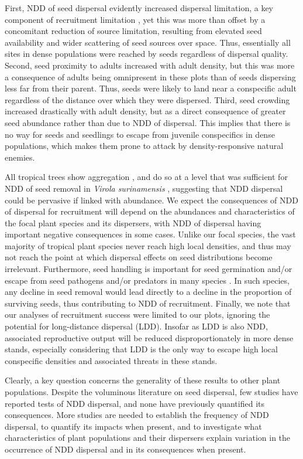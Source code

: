 \documentclass[b5paper,justified]{tufte-book} %
\begin{document}
\begin{fullwidth}
First, NDD of seed dispersal evidently increased dispersal limitation, a key component of recruitment limitation \citep{Nathan2000}, yet this was more than offset by a concomitant reduction of source limitation, resulting from elevated seed availability and wider scattering of seed sources over space. Thus, essentially all sites in dense populations were reached by seeds regardless of dispersal quality. Second, seed proximity to adults increased with adult density, but this was more a consequence of adults being omnipresent in these plots than of seeds dispersing less far from their parent. Thus, seeds were likely to land near a conspecific adult regardless of the distance over which they were dispersed. Third, seed crowding increased drastically with adult density, but as a direct consequence of greater seed abundance rather than due to NDD of dispersal. This implies that there is no way for seeds and seedlings to escape from juvenile conspecifics in dense populations, which makes them prone to attack by density-responsive natural enemies.

All tropical trees show aggregation \citep[e.g.][]{Condit2000}, and do so at a level that was sufficient for NDD of seed removal in \textit{Virola surinamensis} \citep{Manasse1983}, suggesting that NDD dispersal could be pervasive if linked with abundance. We expect the consequences of NDD of dispersal for recruitment will depend on the abundances and characteristics of the focal plant species and its dispersers, with NDD of dispersal having important negative consequences in some cases. Unlike our focal species, the vast majority of tropical plant species never reach high local densities, and thus may not reach the point at which dispersal effects on seed distributions become irrelevant. Furthermore, seed handling is important for seed germination and/or escape from seed pathogens and/or predators in many species \citep[e.g.][]{Traveset1998, Jansen2010}. In such species, any decline in seed removal would lead
directly to a decline in the proportion of surviving seeds, thus contributing to NDD of recruitment. Finally, we note that our analyses of recruitment success were limited to our plots, ignoring the potential for long-distance dispersal (LDD). Insofar as LDD is also NDD, associated reproductive output will be reduced disproportionately in more dense stands, especially considering that LDD is the only way to escape high local conspecific densities and associated threats in these stands.

Clearly, a key question concerns the generality of these results to other plant populations. Despite the voluminous literature on seed dispersal, few studies have reported tests of NDD dispersal, and none have previously quantified its consequences. More studies are needed to establish the frequency of NDD dispersal, to quantify its impacts when present, and to investigate what characteristics of plant populations and their dispersers explain variation in the occurrence of NDD dispersal and in its consequences when present.
\end{fullwidth}
\end{document}
